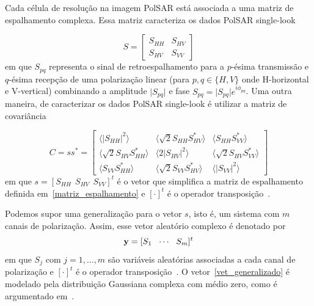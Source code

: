 \documentclass[a4paper,12pt]{article}
\begin{document}
Cada célula de resolução na imagem PolSAR está associada a uma matriz de espalhamento complexa. Essa matriz caracteriza os dados PolSAR single-look

\begin{equation}\label{matriz_espalhamento}
S =\begin{bmatrix}
S_{HH} & S_{HV}\\
S_{HV} & S_{VV}  
\end{bmatrix}
\end{equation}
em que $S_{pq}$ representa o sinal de retroespalhamento para a $p$-ésima transmissão e $q$-ésima recepção de uma polarização linear (para $p,q\in \{H,V\}$ onde H-horizontal e V-vertical) combinando a amplitude $\vert S_{pq}\vert$ e fase $S_{pq}=\vert S_{pq}\vert e^{i\phi_{pq}}$. Uma outra maneira, de caracterizar os dados PolSAR single-look é utilizar a matriz de covariância 

\begin{equation}\label{matriz_covariancia}
C = ss^{*}=\begin{bmatrix}
\langle \vert S_{HH}\vert^2\rangle & \langle \sqrt{2}S_{HH}S^{*}_{HV}\rangle & \langle S_{HH}S^{*}_{VV}\rangle\\
\langle \sqrt{2}S_{HV}S^{*}_{HH}\rangle & \langle 2\vert S_{HV}\vert^2\rangle & \langle \sqrt{2}S_{HV}S^{*}_{VV}\rangle\\
\langle S_{VV}S^{*}_{HH}\rangle & \langle \sqrt{2}S_{VV}S^{*}_{HV}\rangle & \langle \vert S_{VV}\vert^2\rangle  
\end{bmatrix}
\end{equation}
em que $s=[S_{HH}\ \ S_{HV}\ \ S_{VV}]^{t}$ é o vetor que simplifica a matriz de espalhamento definida em~\ref{matriz_espalhamento} e $[\cdot]^{t}$ é o operador transposição~\citep{Lee-2009,ma-2015}. 

Podemos supor uma generalização para o vetor $s$, isto é, um sistema com $m$ canais de polarização. Assim, esse vetor aleatório complexo é denotado por
\begin{equation}
{\bf y}=[S_{1}\ \ \cdots \ \ S_{m}]^{t}\label{vet_generalizado}
\end{equation}
em que $S_{j}$ com $j=1,\dots,m$ são variáveis aleatórias associadas a cada canal de polarização e $[\cdot]^{t}$ é o operador transposição~\citep{Frery-2014}. O vetor~\ref{vet_generalizado} é modelado pela distribuição Gaussiana complexa com médio zero, como é argumentado em~\citep{Goodman-1963}. 
\end{document}
